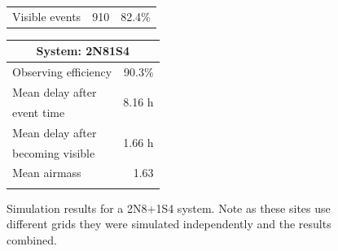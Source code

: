 \begin{colsection}
\begin{colsection}
\begin{figure}[p]
\begin{center}
\begin{minipage}[t]{0.37\textwidth}
\begin{tabular}{lrr}
                \midrule
                Visible events & 910 &  82.4\% \\
            \end{tabular}
        \end{minipage}
        \begin{minipage}[t]{0.35\textwidth}\vspace{0pt}
            \begin{tabular}{lr}
                \multicolumn{2}{c}{\textbf{System: 2N8\+1S4}} \\
                \midrule
                Observing efficiency & 90.3\% \\
                \midrule
                Mean delay after     & \multirow{2}{*}{8.16 h} \\
                event time           & \\
                Mean delay after     & \multirow{2}{*}{1.66 h} \\
                becoming visible     & \\
                \midrule
                Mean airmass         & 1.63 \\
                & \\
            \end{tabular}
        \end{minipage}
    \end{center}
    \caption[GW simulation results: 2N8+1S4 system]{
        Simulation results for a 2N8+1S4 system. Note as these sites use different grids they were simulated independently and the results combined.
    }\label{fig:gw_sim_2n8+1s4}
\end{figure}


\end{colsection}
\end{colsection}
